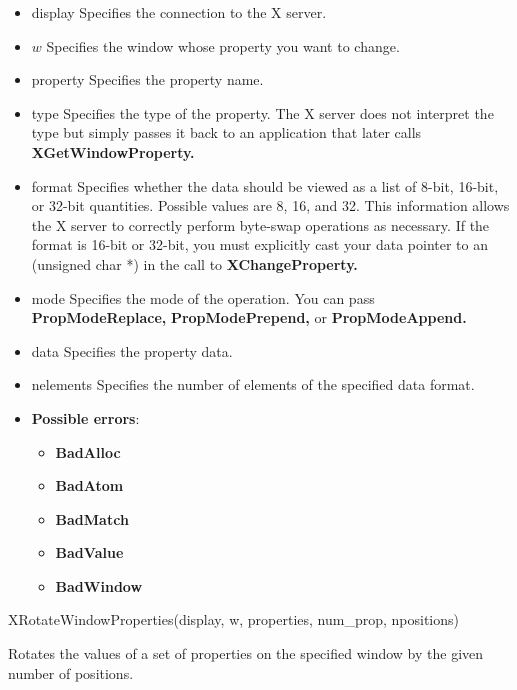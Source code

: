 \documentclass{report}
\begin{document}
\begin{itemize}
            \begin{itemize}
                \item display Specifies the connection to the X server.
                \item $w$ Specifies the window whose property you want to change.
                \item property Specifies the property name.
                \item type Specifies the type of the property. The X server does not interpret the type but simply passes it back to an application that later calls \textbf{XGetWindowProperty.}
                \item format Specifies whether the data should be viewed as a list of 8-bit, 16-bit, or 32-bit quantities. Possible values are 8, 16, and 32. This information allows the X server to correctly perform byte-swap operations as necessary. If the format is 16-bit or 32-bit, you must explicitly cast your data pointer to an (unsigned char *) in the call to \textbf{XChangeProperty.}
                \item mode Specifies the mode of the operation. You can pass \textbf{PropModeReplace,} \textbf{PropModePrepend,} or \textbf{PropModeAppend.}
                \item data Specifies the property data.
                \item nelements Specifies the number of elements of the specified data format.
            \end{itemize}

            \begin{itemize}
                \item \textbf{Possible errors}:
                    \begin{itemize}
                        \item \textbf{BadAlloc}
                        \item \textbf{BadAtom}
                        \item \textbf{BadMatch}
                        \item \textbf{BadValue}
                        \item \textbf{BadWindow}
                    \end{itemize}
            \end{itemize}

            \begin{cppcode}
            XRotateWindowProperties(display, w, properties, num_prop, npositions)
            \end{cppcode}
            \bigbreak \noindent
            Rotates the values of a set of properties on the specified window by the given number of positions.


\end{itemize}
\end{document}
